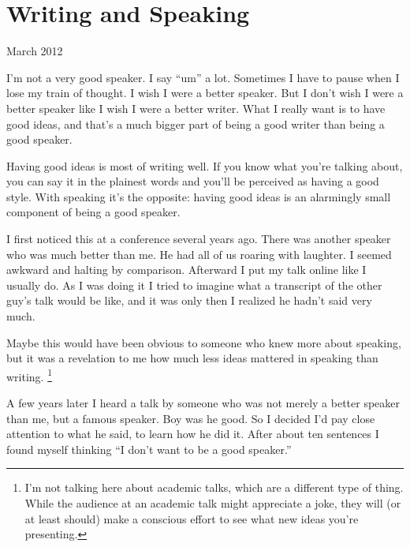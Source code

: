 \chapter{Writing and Speaking}

March 2012

I'm not a very good speaker. I say ``um'' a lot. Sometimes I have to
pause when I lose my train of thought. I wish I were a better speaker.
But I don't wish I were a better speaker like I wish I were a better
writer. What I really want is to have good ideas, and that's a much
bigger part of being a good writer than being a good speaker.

Having good ideas is most of writing well. If you know what you're
talking about, you can say it in the plainest words and you'll be
perceived as having a good style. With speaking it's the opposite:
having good ideas is an alarmingly small component of being a good
speaker.

I first noticed this at a conference several years ago. There was
another speaker who was much better than me. He had all of us roaring
with laughter. I seemed awkward and halting by comparison. Afterward I
put my talk online like I usually do. As I was doing it I tried to
imagine what a transcript of the other guy's talk would be like, and it
was only then I realized he hadn't said very much.

Maybe this would have been obvious to someone who knew more about
speaking, but it was a revelation to me how much less ideas mattered in
speaking than writing. \footnote{I'm not talking here about academic talks, which are a different
type of thing. While the audience at an academic talk might appreciate a
joke, they will (or at least should) make a conscious effort to see what
new ideas you're presenting.}

A few years later I heard a talk by someone who was not merely a better
speaker than me, but a famous speaker. Boy was he good. So I decided I'd
pay close attention to what he said, to learn how he did it. After about
ten sentences I found myself thinking ``I don't want to be a good
speaker.''

